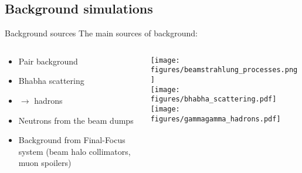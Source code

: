 \subsection{Background simulations}

\begin{frame}{Background sources}
\ilclogo
The main sources of background:
\begin{columns}
 \begin{column}{0.55\textwidth}
  \begin{itemize}
    \item Pair background
    \item Bhabha scattering
    \item \textgamma \textgamma $\rightarrow$ hadrons
    \item Neutrons from the beam dumps
    \item Background from Final-Focus system (beam halo collimators, muon spoilers)
  \end{itemize}
 \end{column}
 \begin{column}{0.45\textwidth}
 \texttt{[image: figures/beamstrahlung\_processes.png]}\\
 \texttt{[image: figures/bhabha\_scattering.pdf]} 
 \texttt{[image: figures/gammagamma\_hadrons.pdf]}
 \end{column}
\end{columns}

\vspace*{0.5cm}
\end{frame}


